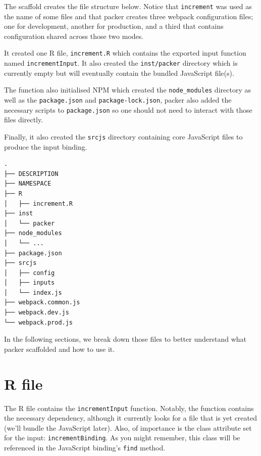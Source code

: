 \documentclass[
  10pt,
]{krantz}
\begin{document}
The scaffold creates the file structure below. Notice that \texttt{increment} was used as the name of some files and that packer creates three webpack configuration files; one for development, another for production, and a third that contains configuration shared across those two modes.

It created one R file, \texttt{increment.R} which contains the exported input function named \texttt{incrementInput}. It also created the \texttt{inst/packer} directory which is currently empty but will eventually contain the bundled JavaScript file(s).

The function also initialised NPM which created the \texttt{node\_modules} directory as well as the \texttt{package.json} and \texttt{package-lock.json}, packer also added the necessary scripts to \texttt{package.json} so one should not need to interact with those files directly.

Finally, it also created the \texttt{srcjs} directory containing core JavaScript files to produce the input binding.

\begin{verbatim}
.
├── DESCRIPTION
├── NAMESPACE
├── R
│   ├── increment.R
├── inst
│   └── packer
├── node_modules
│   └── ...
├── package.json
├── srcjs
│   ├── config
│   ├── inputs
│   └── index.js
├── webpack.common.js
├── webpack.dev.js
└── webpack.prod.js
\end{verbatim}

In the following sections, we break down those files to better understand what packer scaffolded and how to use it.

\hypertarget{packer-r-file}{%
\section{R file}\label{packer-r-file}}

The R file contains the \texttt{incrementInput} function. Notably, the function contains the necessary dependency, although it currently looks for a file that is yet created (we'll bundle the JavaScript later). Also, of importance is the class attribute set for the input: \texttt{incrementBinding}. As you might remember, this class will be referenced in the JavaScript binding's \texttt{find} method.
\end{document}
